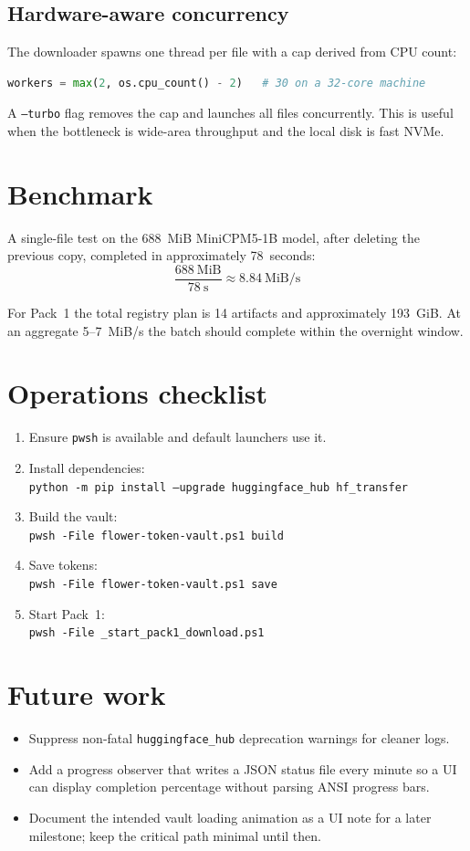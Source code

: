 \documentclass[11pt,a4paper]{article}
\begin{document}
\subsection{Hardware-aware concurrency}
The downloader spawns one thread per file with a cap derived from CPU count:
\begin{lstlisting}[language=Python]
workers = max(2, os.cpu_count() - 2)   # 30 on a 32-core machine
\end{lstlisting}
A \texttt{--turbo} flag removes the cap and launches all files concurrently.  This is useful when the bottleneck is wide-area throughput and the local disk is fast NVMe.

\section{Benchmark}
A single-file test on the 688~MiB MiniCPM5-1B model, after deleting the previous copy, completed in approximately 78~seconds:
\begin{equation*}
\frac{688\ \text{MiB}}{78\ \text{s}} \approx 8.84\ \text{MiB/s}
\end{equation*}

For Pack~1 the total registry plan is 14 artifacts and approximately 193~GiB.  At an aggregate 5--7~MiB/s the batch should complete within the overnight window.

\section{Operations checklist}
\begin{enumerate}
  \item Ensure \texttt{pwsh} is available and default launchers use it.
  \item Install dependencies:\\ \texttt{python -m pip install --upgrade huggingface\_hub hf\_transfer}
  \item Build the vault:\\ \texttt{pwsh -File flower-token-vault.ps1 build}
  \item Save tokens:\\ \texttt{pwsh -File flower-token-vault.ps1 save}
  \item Start Pack~1:\\ \texttt{pwsh -File \_start\_pack1\_download.ps1}
\end{enumerate}

\section{Future work}
\begin{itemize}
  \item Suppress non-fatal \texttt{huggingface\_hub} deprecation warnings for cleaner logs.
  \item Add a progress observer that writes a JSON status file every minute so a UI can display completion percentage without parsing ANSI progress bars.
  \item Document the intended vault loading animation as a UI note for a later milestone; keep the critical path minimal until then.
\end{itemize}
\end{document}

